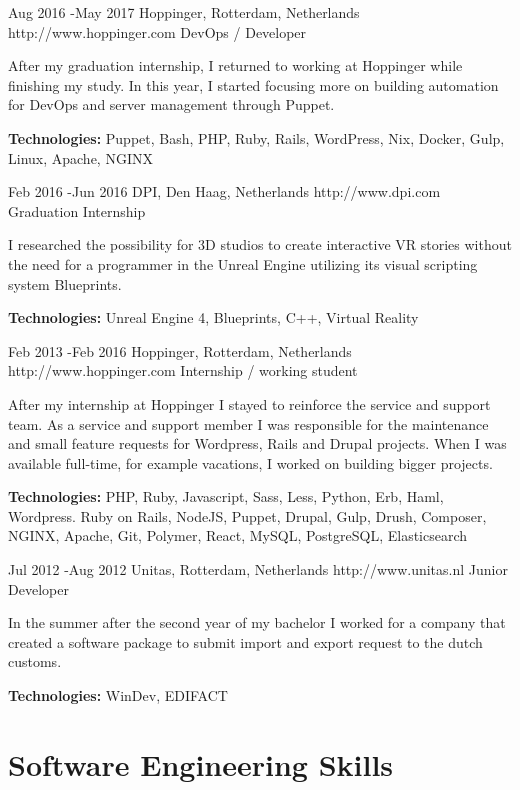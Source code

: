 \documentclass[10pt]{article} %
\begin{document}
\job
{Aug 2016 -}{May 2017}
{Hoppinger, Rotterdam, Netherlands}
{http://www.hoppinger.com}
{DevOps / Developer}
{After my graduation internship, I returned to working at Hoppinger while finishing my study. In this year, I started focusing more on building automation for DevOps and server management through Puppet.

\rule{0mm}{5mm}\textbf{Technologies:} Puppet, Bash, PHP, Ruby, Rails, WordPress, Nix, Docker, Gulp, Linux, Apache, NGINX }

\job
{Feb 2016 -}{Jun 2016}
{DPI, Den Haag, Netherlands}
{http://www.dpi.com}
{Graduation Internship}
{I researched the possibility for 3D studios to create interactive VR stories without the need for a programmer in the Unreal Engine utilizing its visual scripting system Blueprints.\\

\rule{0mm}{5mm}\textbf{Technologies:} Unreal Engine 4, Blueprints, C++, Virtual Reality}

\job
{Feb 2013 -}{Feb 2016}
{Hoppinger, Rotterdam, Netherlands}
{http://www.hoppinger.com}
{Internship / working student}
{After my internship at Hoppinger I stayed to reinforce the service and support team. As a service and support member I was responsible for the maintenance and small feature requests for Wordpress, Rails and Drupal projects. When I was available full-time, for example vacations, I worked on building bigger projects.

\rule{0mm}{5mm}\textbf{Technologies:} PHP, Ruby, Javascript, Sass, Less, Python, Erb, Haml, Wordpress. Ruby on Rails, NodeJS, Puppet, Drupal, Gulp, Drush, Composer, NGINX, Apache, Git, Polymer, React, MySQL, PostgreSQL, Elasticsearch
}

\job
{Jul 2012 -}{Aug 2012}
{Unitas, Rotterdam, Netherlands}
{http://www.unitas.nl}
{Junior Developer}
{In the summer after the second year of my bachelor I worked for a company that created a software package to submit import and export request to the dutch customs.

\rule{0mm}{5mm}\textbf{Technologies:} WinDev, EDIFACT
}


\section{Software Engineering Skills}
\end{document}
